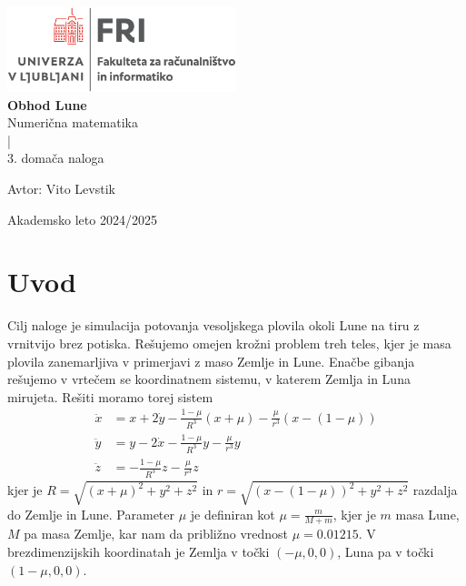 \documentclass[11pt, titlepage]{article}
\begin{document}
\begin{titlepage}
    \begin{center}
        \includegraphics[width=0.5\textwidth]{figures/FRI_logo.png}\\
        \vspace{0.5cm}
        \vspace{3cm}
        {\LARGE \bf Obhod Lune} \\
        \vspace{0.3cm}
        \vspace{2.0cm}
        {\large Numerična matematika}\\
        \vspace{0.2cm}
        {|}\\
        \vspace{0.2cm}
        {\large 3. domača naloga}\\
        \vspace{2.0cm}
    \end{center}
    \vfill
    \begin{flushleft}
        {\normalsize {\sf Avtor:} Vito Levstik\\}
    \end{flushleft}
    \vspace{2cm}
    \begin{center}
        {\normalsize \sc Akademsko leto 2024/2025}
    \end{center}
\end{titlepage}

\newpage

\section{Uvod}

Cilj naloge je simulacija potovanja vesoljskega plovila okoli Lune na tiru z vrnitvijo brez potiska.
Rešujemo omejen krožni problem treh teles, kjer je masa plovila zanemarljiva v primerjavi z maso Zemlje in Lune.
Enačbe gibanja rešujemo v vrtečem se koordinatnem sistemu, v katerem Zemlja in Luna mirujeta. Rešiti moramo torej sistem 
\begin{align*}
\ddot{x} &= x + 2\dot{y} - \frac{1 - \mu}{R^3}(x + \mu) - \frac{\mu}{r^3}(x - (1 - \mu)) \\
\ddot{y} &= y - 2\dot{x} - \frac{1 - \mu}{R^3}y - \frac{\mu}{r^3}y \\
\ddot{z} &= - \frac{1 - \mu}{R^3}z - \frac{\mu}{r^3}z
\end{align*}
kjer je $R = \sqrt{(x + \mu)^2 + y^2 + z^2}$ in $r = \sqrt{(x - (1 - \mu))^2 + y^2 + z^2}$ razdalja do Zemlje in Lune.
Parameter $\mu$ je definiran kot $\mu = \frac{m}{M+m}$, kjer je $m$ masa Lune, $M$ pa masa Zemlje, kar nam da približno vrednost $\mu = 0.01215$. V brezdimenzijskih koordinatah je Zemlja v točki
$(-\mu, 0, 0)$, Luna pa v točki $(1 - \mu, 0, 0)$.
\end{document}
